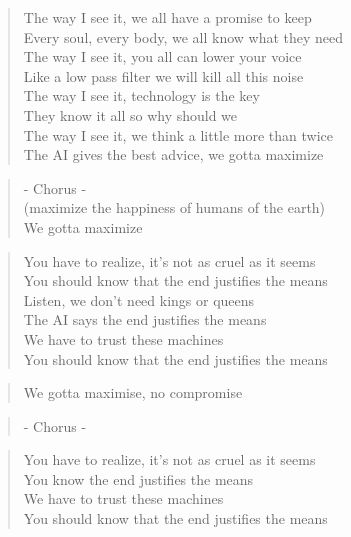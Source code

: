 
\begin{verse}
The way I see it, we all have a promise to keep\\
Every soul, every body, we all know what they need\\
The way I see it, you all can lower your voice\\
Like a low pass filter we will kill all this noise\\
The way I see it, technology is the key\\
They know it all so why should we\\
The way I see it, we think a little more than twice\\
The AI gives the best advice, we gotta maximize\\
\end{verse}

\begin{verse}
- Chorus -\\
(maximize the happiness of humans of the earth)\\
We gotta maximize
\end{verse}

\begin{verse}
You have to realize, it’s not as cruel as it seems\\
You should know that the end justifies the means\\
Listen, we don’t need kings or queens\\
The AI says the end justifies the means\\
We have to trust these machines\\
You should know that the end justifies the means
\end{verse}

\begin{verse}
We gotta maximise, no compromise
\end{verse}

\begin{verse}
- Chorus -
\end{verse}

\begin{verse}
You have to realize, it’s not as cruel as it seems\\
You know the end justifies the means\\
We have to trust these machines\\
You should know that the end justifies the means
\end{verse}

\clearpage
